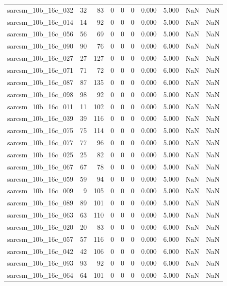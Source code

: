 \documentclass{article}
\begin{document}
\begin{longtable}{lrrrrrrrrr}
sarcsm\_10b\_16c\_032 & 32 & 83 & 0 & 0 & 0 & 0.000 & 5.000 & NaN & NaN \\
sarcsm\_10b\_16c\_014 & 14 & 92 & 0 & 0 & 0 & 0.000 & 5.000 & NaN & NaN \\
sarcsm\_10b\_16c\_056 & 56 & 69 & 0 & 0 & 0 & 0.000 & 5.000 & NaN & NaN \\
sarcsm\_10b\_16c\_090 & 90 & 76 & 0 & 0 & 0 & 0.000 & 6.000 & NaN & NaN \\
sarcsm\_10b\_16c\_027 & 27 & 127 & 0 & 0 & 0 & 0.000 & 5.000 & NaN & NaN \\
sarcsm\_10b\_16c\_071 & 71 & 72 & 0 & 0 & 0 & 0.000 & 6.000 & NaN & NaN \\
sarcsm\_10b\_16c\_087 & 87 & 135 & 0 & 0 & 0 & 0.000 & 6.000 & NaN & NaN \\
sarcsm\_10b\_16c\_098 & 98 & 92 & 0 & 0 & 0 & 0.000 & 5.000 & NaN & NaN \\
sarcsm\_10b\_16c\_011 & 11 & 102 & 0 & 0 & 0 & 0.000 & 5.000 & NaN & NaN \\
sarcsm\_10b\_16c\_039 & 39 & 116 & 0 & 0 & 0 & 0.000 & 5.000 & NaN & NaN \\
sarcsm\_10b\_16c\_075 & 75 & 114 & 0 & 0 & 0 & 0.000 & 5.000 & NaN & NaN \\
sarcsm\_10b\_16c\_077 & 77 & 96 & 0 & 0 & 0 & 0.000 & 5.000 & NaN & NaN \\
sarcsm\_10b\_16c\_025 & 25 & 82 & 0 & 0 & 0 & 0.000 & 5.000 & NaN & NaN \\
sarcsm\_10b\_16c\_067 & 67 & 78 & 0 & 0 & 0 & 0.000 & 5.000 & NaN & NaN \\
sarcsm\_10b\_16c\_059 & 59 & 94 & 0 & 0 & 0 & 0.000 & 5.000 & NaN & NaN \\
sarcsm\_10b\_16c\_009 & 9 & 105 & 0 & 0 & 0 & 0.000 & 5.000 & NaN & NaN \\
sarcsm\_10b\_16c\_089 & 89 & 101 & 0 & 0 & 0 & 0.000 & 5.000 & NaN & NaN \\
sarcsm\_10b\_16c\_063 & 63 & 110 & 0 & 0 & 0 & 0.000 & 5.000 & NaN & NaN \\
sarcsm\_10b\_16c\_020 & 20 & 83 & 0 & 0 & 0 & 0.000 & 6.000 & NaN & NaN \\
sarcsm\_10b\_16c\_057 & 57 & 116 & 0 & 0 & 0 & 0.000 & 6.000 & NaN & NaN \\
sarcsm\_10b\_16c\_042 & 42 & 106 & 0 & 0 & 0 & 0.000 & 6.000 & NaN & NaN \\
sarcsm\_10b\_16c\_093 & 93 & 92 & 0 & 0 & 0 & 0.000 & 6.000 & NaN & NaN \\
sarcsm\_10b\_16c\_064 & 64 & 101 & 0 & 0 & 0 & 0.000 & 5.000 & NaN & NaN \\

\end{longtable}
\end{document}
